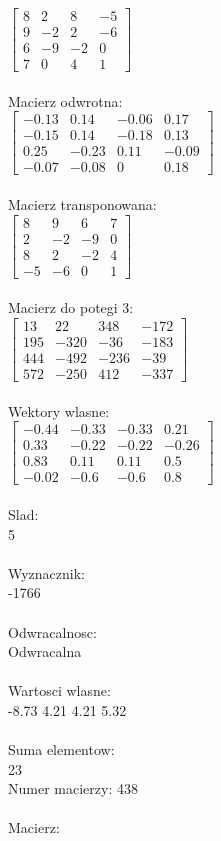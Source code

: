 \documentclass[a4paper,12pt]{article}
\begin{document}
$\begin{bmatrix} 8&2&8&-5\\9&-2&2&-6\\6&-9&-2&0\\7&0&4&1 \end{bmatrix}$
\\
\\
Macierz odwrotna:\\

$\begin{bmatrix} -0.13&0.14&-0.06&0.17\\-0.15&0.14&-0.18&0.13\\0.25&-0.23&0.11&-0.09\\-0.07&-0.08&0&0.18 \end{bmatrix}$
\\
\\
Macierz transponowana:\\

$\begin{bmatrix} 8&9&6&7\\2&-2&-9&0\\8&2&-2&4\\-5&-6&0&1 \end{bmatrix}$
\\
\\
Macierz do potegi 3:\\

$\begin{bmatrix} 13&22&348&-172\\195&-320&-36&-183\\444&-492&-236&-39\\572&-250&412&-337 \end{bmatrix}$
\\
\\
Wektory wlasne:\\

$\begin{bmatrix} -0.44&-0.33&-0.33&0.21\\0.33&-0.22&-0.22&-0.26\\0.83&0.11&0.11&0.5\\-0.02&-0.6&-0.6&0.8 \end{bmatrix}$
\\
\\
Slad:\\
5
\\
\\
Wyznacznik:\\
-1766
\\
\\
Odwracalnosc:\\
Odwracalna
\\
\\
Wartosci wlasne:\\
-8.73 4.21 4.21 5.32
\\
\\
Suma elementow:\\
23
\\
\newpage
Numer macierzy:
438
\\
\\
Macierz:\\
\end{document}
